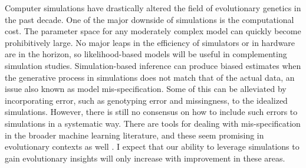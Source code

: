 Computer simulations have drastically altered the field of evolutionary genetics in the past decade.
One of the major downside of simulations is the computational cost.
The parameter space for any moderately complex model can quickly become prohibitively large.
No major leaps in the efficiency of simulators or in hardware are in the horizon, 
so likelihood-based models will be useful in complementing simulation studies.
Simulation-based inference can produce biased estimates when the generative process in simulations does not match that of the actual data,
an issue also known as model mis-specification.
Some of this can be alleviated by incorporating error, such as genotyping error and missingness, to the idealized simulations.
However, there is still no consensus on how to include such errors to simulations in a systematic way.
There are tools for dealing with mis-specification in the broader machine learning literature,
and these seem promising in evolutionary contexts as well \citep{mo_domain-adaptive_2023}.
I expect that our ability to leverage simulations to gain evolutionary insights will only increase with improvement in these areas.
